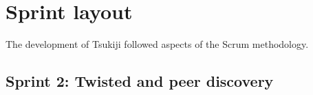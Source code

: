 \section{Sprint layout}
The development of Tsukiji followed aspects of the Scrum methodology.



\subsection{Sprint 2: Twisted and peer discovery}

